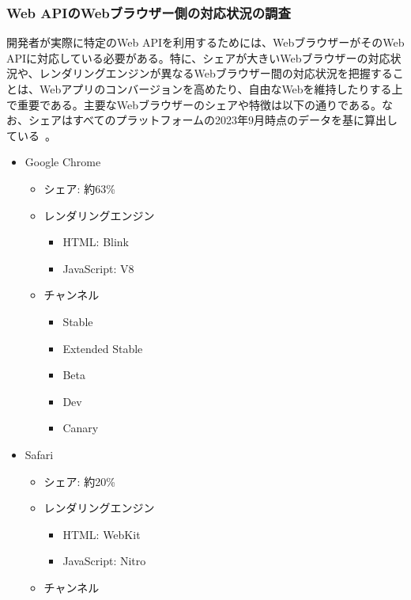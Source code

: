 \subsubsection{Web APIのWebブラウザー側の対応状況の調査}
\label{subsubsection:Web APIのWebブラウザー側の対応状況の調査}
開発者が実際に特定のWeb APIを利用するためには、WebブラウザーがそのWeb APIに対応している必要がある。特に、シェアが大きいWebブラウザーの対応状況や、レンダリングエンジンが異なるWebブラウザー間の対応状況を把握することは、Webアプリのコンバージョンを高めたり、自由なWebを維持したりする上で重要である。主要なWebブラウザーのシェアや特徴は以下の通りである。なお、シェアはすべてのプラットフォームの2023年9月時点のデータを基に算出している~\cite{StatCounterBrowserMarketShare}。
\begin{itemize}
    \item Google Chrome
    \begin{itemize}
        \item シェア: 約63\%
        \item レンダリングエンジン
        \begin{itemize}
            \item HTML: Blink
            \item JavaScript: V8
        \end{itemize}
        \item チャンネル~\cite{GoogleChromeChannels}
        \begin{itemize}
            \item Stable
            \item Extended Stable
            \item Beta
            \item Dev
            \item Canary
        \end{itemize}
    \end{itemize}
    \item Safari
    \begin{itemize}
        \item シェア: 約20\%
        \item レンダリングエンジン
        \begin{itemize}
            \item HTML: WebKit
            \item JavaScript: Nitro
        \end{itemize}
        \item チャンネル~\cite{SafariChannels}
        \begin{itemize}

\end{itemize}
\end{itemize}
\end{itemize}
